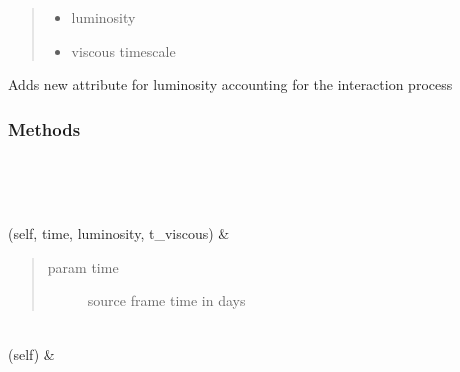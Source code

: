 \documentclass[letterpaper,10pt,english]{sphinxmanual}
\begin{document}
\begin{fulllineitems}
\begin{fulllineitems}
\begin{quote}
\begin{description}
\begin{itemize}
\item {} 
 \textendash{} luminosity

\item {} 
 \textendash{} viscous timescale

\end{itemize}

\end{description}\end{quote}

Adds new attribute for luminosity accounting for the interaction process

\end{fulllineitems}

\subsubsection*{Methods}


\begin{savenotes}\sphinxatlongtablestart\begin{longtable}[c]{}
\hline

\endfirsthead

%
{}\\
\hline

\endhead

\hline
{}\\
\endfoot

\endlastfoot

{\hyperref[\detokenize{generated/sdapy.interaction_processes.Viscous:sdapy.interaction_processes.Viscous.__init__}]{}}(self, time, luminosity, t\_viscous)
&
\begin{quote}\begin{description}
\item[{param time}] \leavevmode
source frame time in days

\end{description}\end{quote}

\\
\hline
{}(self)
&

\\
\hline
\end{longtable}\sphinxatlongtableend\end{savenotes}

\end{fulllineitems}
\end{document}
